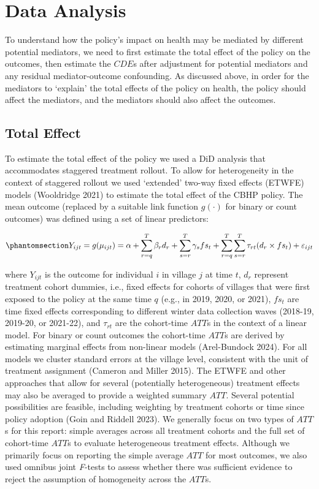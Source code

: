 \documentclass[
  letterpaper,
  DIV=11,
  numbers=noendperiod]{scrartcl}
\begin{document}
\section{Data Analysis}\label{data-analysis}

To understand how the policy's impact on health may be mediated by
different potential mediators, we need to first estimate the total
effect of the policy on the outcomes, then estimate the \(CDE\)s after
adjustment for potential mediators and any residual mediator-outcome
confounding. As discussed above, in order for the mediators to `explain'
the total effects of the policy on health, the policy should affect the
mediators, and the mediators should also affect the outcomes.

\subsection{Total Effect}\label{total-effect}

To estimate the total effect of the policy we used a DiD analysis that
accommodates staggered treatment rollout. To allow for heterogeneity in
the context of staggered rollout we used `extended' two-way fixed
effects (ETWFE) models (Wooldridge 2021) to estimate the total effect of
the CBHP policy. The mean outcome (replaced by a suitable link function
\(g(\cdot)\) for binary or count outcomes) was defined using a set of
linear predictors:

\begin{equation}\phantomsection\label{eq-etwfe}{Y_{ijt}=g(\mu_{ijt}) = \alpha + \sum_{r=q}^{T} \beta_{r} d_{r} + \sum_{s=r}^{T} \gamma_{s} fs_{t}+ \sum_{r=q}^{T} \sum_{s=r}^{T} \tau_{rt} (d_{r} \times fs_{t}) + \varepsilon_{ijt}}\end{equation}

where \(Y_{ijt}\) is the outcome for individual \(i\) in village \(j\)
at time \(t\), \(d_{r}\) represent treatment cohort dummies, i.e., fixed
effects for cohorts of villages that were first exposed to the policy at
the same time \(q\) (e.g., in 2019, 2020, or 2021), \(fs_{t}\) are time
fixed effects corresponding to different winter data collection waves
(2018-19, 2019-20, or 2021-22), and \(\tau_{rt}\) are the cohort-time
\(ATT\)s in the context of a linear model. For binary or count outcomes
the cohort-time \(ATT\)s are derived by estimating marginal effects from
non-linear models (Arel-Bundock 2024). For all models we cluster
standard errors at the village level, consistent with the unit of
treatment assignment (Cameron and Miller 2015). The ETWFE and other
approaches that allow for several (potentially heterogeneous) treatment
effects may also be averaged to provide a weighted summary \(ATT\).
Several potential possibilities are feasible, including weighting by
treatment cohorts or time since policy adoption (Goin and Riddell 2023).
We generally focus on two types of \(ATT\)s for this report: simple
averages across all treatment cohorts and the full set of cohort-time
\(ATT\)s to evaluate heterogeneous treatment effects. Although we
primarily focus on reporting the simple average \(ATT\) for most
outcomes, we also used omnibus joint \emph{F}-tests to assess whether
there was sufficient evidence to reject the assumption of homogeneity
across the \(ATT\)s.
\end{document}
